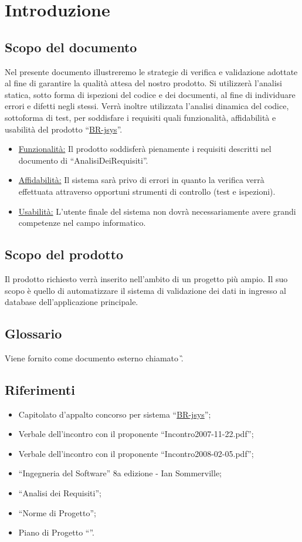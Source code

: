 \chapter{Introduzione}
\section{Scopo del documento}
Nel presente documento illustreremo le strategie di verifica e validazione adottate al fine di garantire la qualit\`a attesa del nostro prodotto. Si utilizzer\`a l'analisi statica, sotto forma di ispezioni del codice e dei documenti, al fine di individuare errori e difetti negli stessi. Verr\`a inoltre utilizzata l'analisi dinamica del codice, sottoforma di test, per soddisfare i requisiti quali funzionalit\`a, affidabilit\`a e usabilit\`a del prodotto ``\underline{BR-jsys}''.
\begin{itemize}
\item \underline{Funzionalit\`a:} \newline
Il prodotto soddisfer\`a pienamente i requisiti descritti nel documento di ``AnalisiDeiRequisiti''.
\item \underline{Affidabilit\`a:} \newline
Il sistema sar\`a privo di errori in quanto la verifica verr\`a effettuata attraverso opportuni strumenti di controllo (test e ispezioni).
\item \underline{Usabilit\`a:} \newline
L'utente finale del sistema non dovr\`a necessariamente avere grandi competenze nel campo informatico.
\end{itemize}

\section{Scopo del prodotto}
Il prodotto richiesto verr\`a inserito nell'ambito di un progetto pi\`u ampio. Il suo scopo \`e quello di automatizzare il sistema di validazione dei dati in ingresso al database dell'applicazione principale.

\section{Glossario}
Viene fornito come documento esterno chiamato \G.
\section{Riferimenti}
\begin{itemize}
\item Capitolato d'appalto concorso per sistema ``\underline{BR-jsys}'';
\item Verbale dell'incontro con il proponente ``Incontro2007-11-22.pdf'';
\item Verbale dell'incontro con il proponente ``Incontro2008-02-05.pdf'';
\item ``Ingegneria del Software'' 8a edizione - Ian Sommerville;
\item ``Analisi dei Requisiti'';
\item ``Norme di Progetto'';
\item Piano di Progetto ``\PdP''.
\end{itemize}

